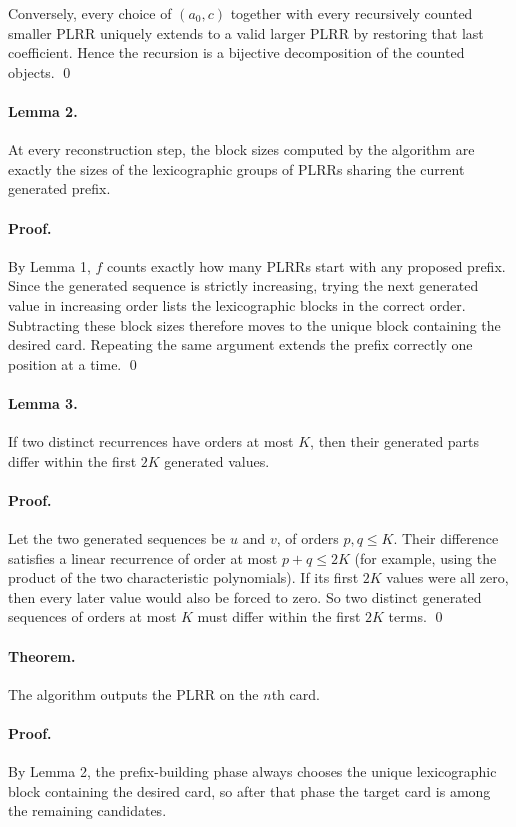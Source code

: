\documentclass[11pt]{article}
\begin{document}
Conversely, every choice of $(a_0,c)$ together with every recursively counted smaller PLRR uniquely
extends to a valid larger PLRR by restoring that last coefficient. Hence the recursion is a bijective
decomposition of the counted objects. \qed

\paragraph{Lemma 2.}
At every reconstruction step, the block sizes computed by the algorithm are exactly the sizes of the
lexicographic groups of PLRRs sharing the current generated prefix.

\paragraph{Proof.}
By Lemma 1, $f$ counts exactly how many PLRRs start with any proposed prefix. Since the generated
sequence is strictly increasing, trying the next generated value in increasing order lists the lexicographic
blocks in the correct order. Subtracting these block sizes therefore moves to the unique block containing
the desired card. Repeating the same argument extends the prefix correctly one position at a time. \qed

\paragraph{Lemma 3.}
If two distinct recurrences have orders at most $K$, then their generated parts differ within the first
$2K$ generated values.

\paragraph{Proof.}
Let the two generated sequences be $u$ and $v$, of orders $p,q \le K$. Their difference satisfies a linear
recurrence of order at most $p+q \le 2K$ (for example, using the product of the two characteristic
polynomials). If its first $2K$ values were all zero, then every later value would also be forced to zero.
So two distinct generated sequences of orders at most $K$ must differ within the first $2K$ terms. \qed

\paragraph{Theorem.}
The algorithm outputs the PLRR on the $n$th card.

\paragraph{Proof.}
By Lemma 2, the prefix-building phase always chooses the unique lexicographic block containing the
desired card, so after that phase the target card is among the remaining candidates.
\end{document}
